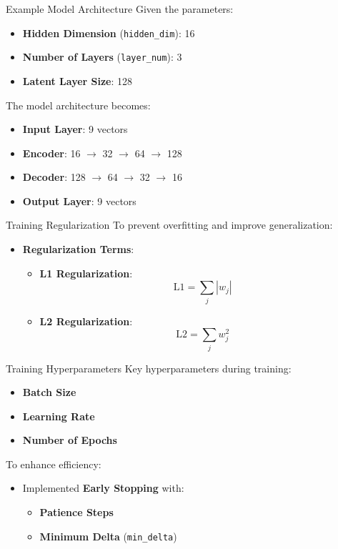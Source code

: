 \documentclass[9pt]{beamer}
\begin{document}
\begin{frame}{Example Model Architecture}
  Given the parameters:
  \begin{itemize}
    \item \textbf{Hidden Dimension} (\texttt{hidden\_dim}): 16
    \item \textbf{Number of Layers} (\texttt{layer\_num}): 3
    \item \textbf{Latent Layer Size}: 128
  \end{itemize}
  The model architecture becomes:
  \begin{itemize}
    \item \textbf{Input Layer}: 9 vectors
    \item \textbf{Encoder}: 16 $\rightarrow$ 32 $\rightarrow$ 64 $\rightarrow$ 128
    \item \textbf{Decoder}: 128 $\rightarrow$ 64 $\rightarrow$ 32 $\rightarrow$ 16
    \item \textbf{Output Layer}: 9 vectors
  \end{itemize}
\end{frame}

\begin{frame}{Training Regularization}
  To prevent overfitting and improve generalization:
  \begin{itemize}
    \item \textbf{Regularization Terms}:
    \begin{itemize}
      \item \textbf{L1 Regularization}:
        \[
        \text{L1} = \sum_{j} |w_j|
        \]
      \item \textbf{L2 Regularization}:
        \[
        \text{L2} = \sum_{j} w_j^2
        \]
    \end{itemize}
  \end{itemize}
\end{frame}

\begin{frame}{Training Hyperparameters}
  Key hyperparameters during training:
  \begin{itemize}
    \item \textbf{Batch Size}
    \item \textbf{Learning Rate}
    \item \textbf{Number of Epochs}
  \end{itemize}
  To enhance efficiency:
  \begin{itemize}
    \item Implemented \textbf{Early Stopping} with:
    \begin{itemize}
      \item \textbf{Patience Steps}
      \item \textbf{Minimum Delta} (\texttt{min\_delta})
    \end{itemize}
  \end{itemize}
\end{frame}
\end{document}
